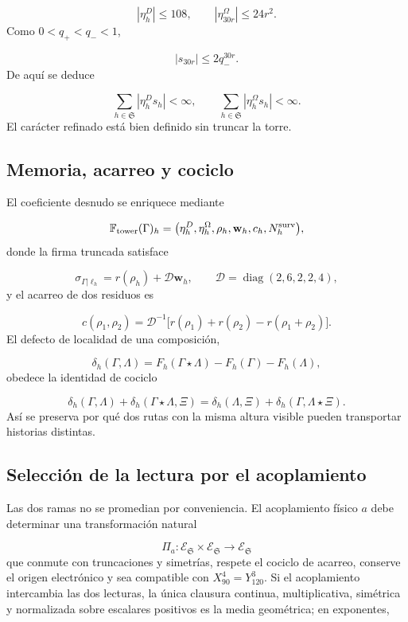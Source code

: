 \[
 |\eta_h^D|\le108,\qquad
 |\eta_{30r}^{\Omega}|\le24r^2.
\]
Como \(0<q_+<q_-<1\),

\[
 |s_{30r}|\le2q_-^{30r}.
\]
De aquí se deduce

\[
 \sum_{h\in\mathfrak S}|\eta_h^D s_h|<\infty,
 \qquad
 \sum_{h\in\mathfrak S}|\eta_h^\Omega s_h|<\infty.
\]
El carácter refinado está bien definido sin truncar la torre.

\subsection{Memoria, acarreo y cociclo}
El coeficiente desnudo se enriquece mediante

\[
 \mathbb F_{\rm tower}(\Gamma)_h
 =\bigl(\eta_h^D,\eta_h^\Omega,\rho_h,
 \mathbf w_h,c_h,N_h^{\rm surv}\bigr),
\]
donde la firma truncada satisface

\[
 \sigma_{\Gamma|\ell_h}
 =r(\rho_h)+\mathcal D\mathbf w_h,
 \qquad
 \mathcal D=\operatorname{diag}(2,6,2,2,4),
\]
y el acarreo de dos residuos es

\[
 c(\rho_1,\rho_2)=
 \mathcal D^{-1}
 \bigl[r(\rho_1)+r(\rho_2)-r(\rho_1+\rho_2)\bigr].
\]
El defecto de localidad de una composición,

\[
 \delta_h(\Gamma,\Lambda)=
 F_h(\Gamma\star\Lambda)-F_h(\Gamma)-F_h(\Lambda),
\]
obedece la identidad de cociclo

\[
 \delta_h(\Gamma,\Lambda)
 +\delta_h(\Gamma\star\Lambda,\Xi)
 =\delta_h(\Lambda,\Xi)
 +\delta_h(\Gamma,\Lambda\star\Xi).
\]
Así se preserva por qué dos rutas con la misma altura visible pueden transportar historias distintas.

\subsection{Selección de la lectura por el acoplamiento}
Las dos ramas no se promedian por conveniencia. El acoplamiento físico \(a\) debe determinar una transformación natural

\[
 \Pi_a:
 \mathcal E_{\mathfrak S}\times\mathcal E_{\mathfrak S}
 \longrightarrow\mathcal E_{\mathfrak S}
\]
que conmute con truncaciones y simetrías, respete el cociclo de acarreo, conserve el origen electrónico y sea compatible con \(X_{90}^{4}=Y_{120}^{3}\). Si el acoplamiento intercambia las dos lecturas, la única clausura continua, multiplicativa, simétrica y normalizada sobre escalares positivos es la media geométrica; en exponentes,

